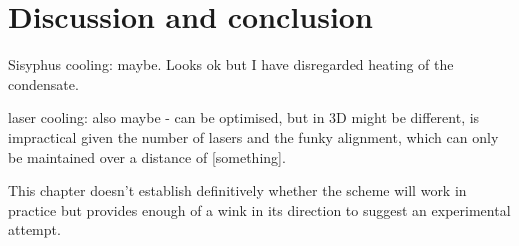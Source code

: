 
\section{Discussion and conclusion}

Sisyphus cooling: maybe. Looks ok but I have disregarded heating of the condensate.

laser cooling: also maybe - can be optimised, but in 3D might be different, is impractical given the number of lasers and the funky alignment, which can only be maintained over a distance of [something].

This chapter doesn't establish definitively whether the scheme will work in practice but provides enough of a wink in its direction to suggest an experimental attempt.